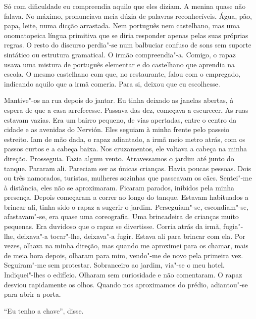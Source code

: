 Só com dificuldade eu compreendia aquilo que eles diziam. A menina quase
não falava. No máximo, pronunciava meia dúzia de palavras reconhecíveis.
Água, pão, papa, leite, numa dicção arrastada. Nem português nem
castelhano, mas uma onomatopeica língua primitiva que se diria responder
apenas pelas suas próprias regras. O resto do discurso perdia"-se num
balbuciar confuso de sons sem suporte sintático ou estrutura
gramatical. O irmão compreendia"-a. Comigo, o rapaz usava uma mistura de
português elementar e do castelhano que aprendia na escola. O mesmo
castelhano com que, no restaurante, falou com o empregado, indicando
aquilo que a irmã comeria. Para si, deixou que eu escolhesse.

Mantive"-os na rua depois do jantar. Eu tinha deixado as janelas
abertas, à espera de que a casa arrefecesse. Passava das dez, começava a
escurecer. As ruas estavam vazias. Era um bairro pequeno, de vias
apertadas, entre o centro da cidade e as avenidas do Nervión. Eles
seguiam à minha frente pelo passeio estreito. Iam de mão dada, o rapaz
adiantado, a irmã meio metro atrás, com os passos curtos e a cabeça
baixa. Nos cruzamentos, ele voltava a cabeça na minha direção.
Prosseguia. Fazia algum vento. Atravessamos o jardim até junto do
tanque. Pararam ali. Pareciam ser as únicas crianças. Havia poucas
pessoas. Dois ou três namorados, turistas, mulheres sozinhas que
passeavam os cães. Sentei"-me à distância, eles não se aproximaram.
Ficaram parados, inibidos pela minha presença. Depois começaram a correr
ao longo do tanque. Estavam habituados a brincar ali, tinha sido o rapaz
a sugerir o jardim. Perseguiam"-se, escondiam"-se, afastavam"-se, era
quase uma coreografia. Uma brincadeira de crianças muito pequenas. Era
duvidoso que o rapaz se divertisse. Corria atrás da irmã, fugia"-lhe,
deixava"-a tocar"-lhe, deixava"-a fugir. Estava ali para brincar com
ela. Por vezes, olhava na minha direção, mas quando me aproximei para
os chamar, mais de meia hora depois, olharam para mim, vendo"-me de novo
pela primeira vez. Seguiram"-me sem protestar. Sobranceiro ao jardim,
via"-se o meu hotel. Indiquei"-lhes o edifício. Olharam sem curiosidade
e não comentaram. O rapaz desviou rapidamente os olhos. Quando nos
aproximamos do prédio, adiantou"-se para abrir a porta.

``Eu tenho a chave'',
disse.

